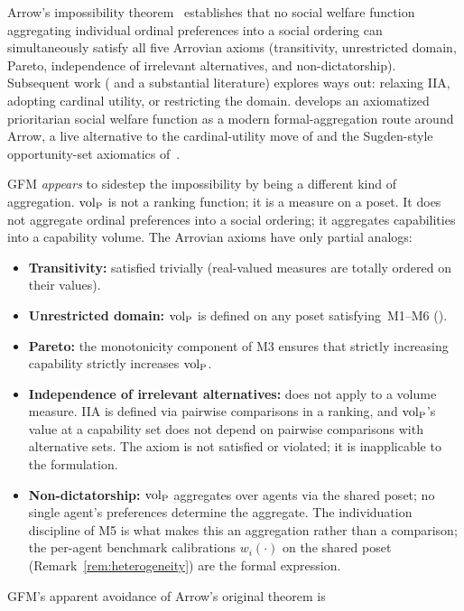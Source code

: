 Arrow's impossibility theorem~\citep{arrow1951social}
establishes that no social welfare function aggregating
individual ordinal preferences into a social ordering can
simultaneously satisfy all five Arrovian axioms (transitivity,
unrestricted domain, Pareto, independence of irrelevant
alternatives, and non-dictatorship).  Subsequent work
(\citep{sen1970collective} and a substantial literature) explores
ways out: relaxing IIA, adopting cardinal utility, or restricting
the domain.  \citet{adler2012wellbeing} develops an axiomatized
prioritarian social welfare function as a modern formal-aggregation
route around Arrow, a live alternative to the cardinal-utility
move of \citep{sen1970collective} and the Sugden-style
opportunity-set axiomatics
of~\citep{sugden2003opportunity}.

GFM \emph{appears} to sidestep the impossibility by being a
different kind of aggregation.  ${\operatorname{vol}_{\mathrm{P}}}$ is not a ranking
function; it is a measure on a poset.  It does not aggregate
ordinal preferences into a social ordering; it aggregates
capabilities into a capability volume.  The Arrovian axioms have
only partial analogs:
\begin{itemize}
\item \textbf{Transitivity:} satisfied trivially (real-valued
  measures are totally ordered on their values).
\item \textbf{Unrestricted domain:} ${\operatorname{vol}_{\mathrm{P}}}$ is defined on any
  poset satisfying~M1--M6
  (\citep[Proposition~1]{lasser2026poset}).
\item \textbf{Pareto:} the monotonicity component of M3 ensures
  that strictly increasing capability strictly increases ${\operatorname{vol}_{\mathrm{P}}}$.
\item \textbf{Independence of irrelevant alternatives:} does not
  apply to a volume measure.  IIA is defined via pairwise
  comparisons in a ranking, and ${\operatorname{vol}_{\mathrm{P}}}$'s value at a capability
  set does not depend on pairwise comparisons with alternative
  sets.  The axiom is not satisfied or violated; it is
  inapplicable to the formulation.
\item \textbf{Non-dictatorship:} ${\operatorname{vol}_{\mathrm{P}}}$ aggregates over agents
  via the shared poset; no single agent's preferences determine
  the aggregate.  The individuation discipline of M5 is what
  makes this an aggregation rather than a comparison; the
  per-agent benchmark calibrations $w_i(\cdot)$ on the shared
  poset (Remark~\ref{rem:heterogeneity}) are the formal
  expression.
\end{itemize}
GFM's apparent avoidance of Arrow's original theorem is
